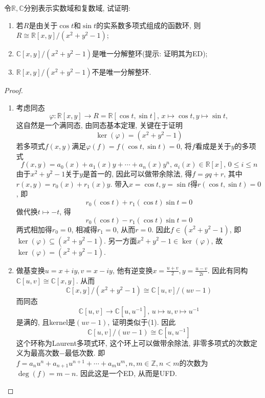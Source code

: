 \begin{problem}\label{ex:2.2.6}
    令$\mathbb{R}, \mathbb{C}$分别表示实数域和复数域, 试证明:
    \begin{enumerate}[(1)]
        \item 若$R$是由关于$\cos t$和$\sin t$的实系数多项式组成的函数环, 则$R \cong \mathbb{R}[x, y]/(x^2 + y^2 - 1)$;
        \item $\mathbb{C}[x, y]/(x^2 + y^2 - 1)$是唯一分解整环(提示: 证明其为ED);
        \item $\mathbb{R}[x, y]/(x^2 + y^2 - 1)$不是唯一分解整环.
    \end{enumerate}
\end{problem}

\begin{proof}
    \begin{enumerate}[(1)]
        \item 考虑同态
        \[
            \varphi: \mathbb{R}[x, y] \to R = \mathbb{R}[\cos t, \sin t],\, x \mapsto \cos t, y \mapsto \sin t,
        \]
        这自然是一个满同态, 由同态基本定理, 关键在于证明
        \[
            \ker(\varphi) = (x^2 + y^2 - 1)
        \]
        若多项式$f(x, y)$满足$\varphi(f) = f(\cos t, \sin t) = 0$, 将$f$看成是关于$y$的多项式
        \[
            f(x, y) = a_0(x) + a_1(x)y + \cdots + a_n(x)y^n,\, a_i(x) \in \mathbb{R}[x],\, 0 \leqslant i \leqslant n
        \]
        由于$x^2 + y^2 - 1$关于$y$是首一的, 因此可以做带余除法, 得$f = gq + r$, 其中$r(x, y) = r_0(x) + r_1(x)y$. 带入$x = \cos t, y = \sin t$得$r(\cos t, \sin t) = 0$, 即
        \[
            r_0(\cos t) + r_1(\cos t)\sin t = 0
        \]
        做代换$t \mapsto -t$, 得
        \[
            r_0(\cos t) - r_1(\cos t)\sin t = 0
        \]
        两式相加得$r_0 = 0$, 相减得$r_1 = 0$, 从而$r = 0$. 因此$f \in (x^2 + y^2 - 1)$, 即$\ker(\varphi) \subseteq (x^2 + y^2 - 1)$. 另一方面$x^2 + y^2 - 1 \in \ker(\varphi)$, 故$\ker(\varphi) = (x^2 + y^2 - 1)$.
        \item 做基变换$u = x + iy, v = x - iy$, 他有逆变换$x = \frac{u + v}{2}, y = \frac{u - v}{2i}$. 因此有同构$\mathbb{C}[u, v] \cong \mathbb{C}[x, y]$. 从而
        \[
            \mathbb{C}[x, y]/(x^2 + y^2 - 1) \cong \mathbb{C}[u, v]/(uv - 1)
        \]
        而同态
        \[
            \mathbb{C}[u, v] \to \mathbb{C}[u, u^{-1}],\, u \mapsto u, v \mapsto u^{-1}
        \]
        是满的, 且kernel是$(uv - 1)$, 证明类似于(1). 因此
        \[
            \mathbb{C}[u, v]/(uv - 1) \cong \mathbb{C}[u, u^{-1}]
        \]
        这个环称为Laurent多项式环, 这个环上可以做带余除法, 非零多项式的次数定义为最高次数$-$最低次数. 即$f = a_nu^n + a_{n + 1}u^{n + 1} + \cdots + a_mu^m, n, m \in \mathbb{Z}, n < m$的次数为$\deg(f) = m - n$. 因此这是一个ED, 从而是UFD.

\end{enumerate}
\end{proof}

